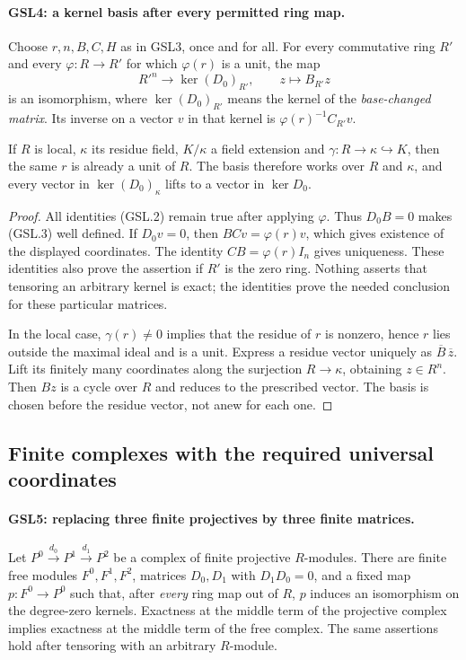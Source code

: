 \paragraph{GSL4: a kernel basis after every permitted ring map.}
\label{claim:GSL4}
Choose $r,n,B,C,H$ as in GSL3, once and for all.  For every commutative
ring $R'$ and every $\varphi:R\to R'$ for which $\varphi(r)$ is a
unit, the map
\[
 R'^n\longrightarrow\ker(D_0)_{R'},\qquad z\longmapsto B_{R'}z
 \tag{GSL.3}
\]
is an isomorphism, where $\ker(D_0)_{R'}$ means the kernel of the
\emph{base-changed matrix}.  Its inverse on a vector $v$ in that kernel
is $\varphi(r)^{-1}C_{R'}v$.

If $R$ is local, $\kappa$ its residue field, $K/\kappa$ a field
extension and $\gamma:R\to\kappa\hookrightarrow K$, then the
same $r$ is already a unit of $R$.  The basis therefore works over $R$
and $\kappa$, and every vector in $\ker(D_0)_\kappa$ lifts to a
vector in $\ker D_0$.

\begin{proof}
All identities (GSL.2) remain true after applying $\varphi$.  Thus
$D_0B=0$ makes (GSL.3) well defined.  If $D_0v=0$, then
$BCv=\varphi(r)v$, which gives existence of the displayed coordinates.
The identity $CB=\varphi(r)I_n$ gives uniqueness.  These identities
also prove the assertion if $R'$ is the zero ring.  Nothing asserts
that tensoring an arbitrary kernel is exact; the identities prove the
needed conclusion for these particular matrices.

In the local case, $\gamma(r)\ne0$ implies that the residue of $r$
is nonzero, hence $r$ lies outside the maximal ideal and is a unit.
Express a residue vector uniquely as $\overline B\,\overline z$.
Lift its finitely many coordinates along the surjection
$R\to\kappa$, obtaining $z\in R^n$.  Then $Bz$ is a cycle over $R$
and reduces to the prescribed vector.  The basis is chosen before the
residue vector, not anew for each one.
\end{proof}

\subsection{Finite complexes with the required universal coordinates}

\paragraph{GSL5: replacing three finite projectives by three finite matrices.}
\label{claim:GSL5}
Let $P^0\xrightarrow{d_0}P^1\xrightarrow{d_1}P^2$ be a complex
of finite projective $R$-modules.  There are finite free modules
$F^0,F^1,F^2$, matrices $D_0,D_1$ with $D_1D_0=0$, and a fixed
map $p:F^0\to P^0$ such that, after \emph{every} ring map out of $R$,
$p$ induces an isomorphism on the degree-zero kernels.  Exactness at
the middle term of the projective complex implies exactness at the
middle term of the free complex.  The same assertions hold after
tensoring with an arbitrary $R$-module.

